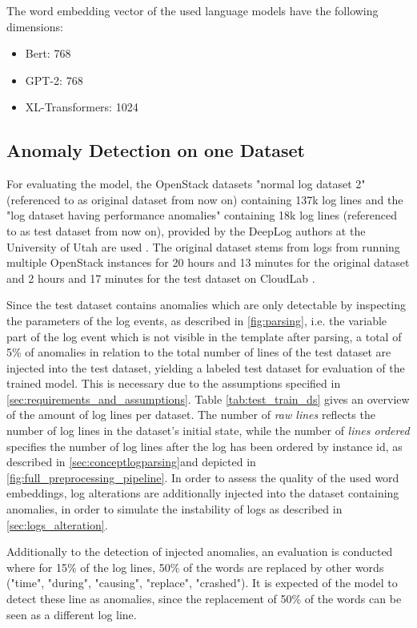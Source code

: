 \noindent The word embedding vector of the used language models have the following dimensions:
\begin{itemize}
	\item Bert: 768 
	\item GPT-2: 768
	\item XL-Transformers: 1024
\end{itemize}

\subsection{Anomaly Detection on one Dataset \label{sec:ad_one_ds_result}}
For evaluating the model, the OpenStack datasets "normal log dataset 2" (referenced to as original dataset from now on) containing 137k log lines and the "log dataset having performance anomalies" containing 18k log lines (referenced to as test dataset from now on), provided by the DeepLog authors at the University of Utah are used \cite{utah_dataset}. The original dataset stems from logs from running multiple OpenStack instances for 20 hours and 13 minutes for the original dataset and 2 hours and 17 minutes for the test dataset on CloudLab \cite{cloudlab}. 

Since the test dataset contains anomalies which are only detectable by inspecting the parameters of the log events, as described in \ref{fig:parsing}, i.e. the variable part of the log event which is not visible in the template after parsing, a total of 5\% of anomalies in relation to the total number of lines of the test dataset are injected into the test dataset, yielding a labeled test dataset for evaluation of the trained model. This is necessary due to the assumptions specified in \ref{sec:requirements_and_assumptions}. Table \ref{tab:test_train_ds} gives an overview of the amount of log lines per dataset. The number of \textit{raw lines} reflects the number of log lines in the dataset's initial state, while the number of \textit{lines ordered} specifies the number of log lines after the log has been ordered by instance id, as described in \ref{sec:conceptlogparsing}and depicted in \ref{fig:full_preprocessing_pipeline}.
In order to assess the quality of the used word embeddings, log alterations are additionally injected into the dataset containing anomalies, in order to simulate the instability of logs as described in \ref{sec:logs_alteration}. 

Additionally to the detection of injected anomalies, an evaluation is conducted where for 15\% of the log lines, 50\% of the words are replaced by other words ("time", "during", "causing", "replace", "crashed"). It is expected of the model to detect these line as anomalies, since the replacement of 50\% of the words can be seen as a different log line.

